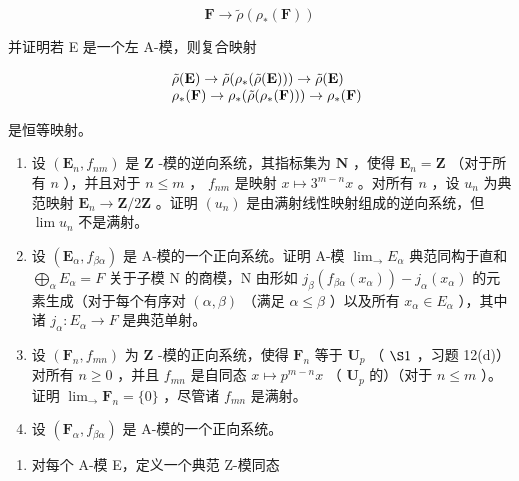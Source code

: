 \[
\mathbf {F} \rightarrow \tilde {\rho} (\rho_ {*} (\mathbf {F}))
\]

并证明若 E 是一个左 A-模，则复合映射

\[
\begin{array}{r l} & {\tilde {\rho} (\mathbf {E}) \to \tilde {\rho} (\rho_ {*} (\tilde {\rho} (\mathbf {E}))) \to \tilde {\rho} (\mathbf {E})} \\ & {\rho_ {*} (\mathbf {F}) \to \rho_ {*} (\tilde {\rho} (\rho_ {*} (\mathbf {F}))) \to \rho_ {*} (\mathbf {F})} \end{array}
\]

是恒等映射。

\BourbakiExercisesSection

\begin{enumerate}
\def\labelenumi{\arabic{enumi}.}
\item
  设 \((\mathbf{E}_n, f_{nm})\) 是 \(\mathbf{Z}\) -模的逆向系统，其指标集为 \(\mathbf{N}\) ，使得 \(\mathbf{E}_n = \mathbf{Z}\) （对于所有 \(n\) ），并且对于 \(n \leqslant m\) ， \(f_{nm}\) 是映射 \(x \mapsto 3^{m - n}x\) 。对所有 \(n\) ，设 \(u_n\) 为典范映射 \(\mathbf{E}_n \to \mathbf{Z}/2\mathbf{Z}\) 。证明 \((u_n)\) 是由满射线性映射组成的逆向系统，但 \(\lim u_n\) 不是满射。
\item
  设 \((\mathbf{E}_{\alpha}, f_{\beta\alpha})\) 是 A-模的一个正向系统。证明 A-模 \(\lim_{\rightarrow} E_{\alpha}\) 典范同构于直和 \(\bigoplus_{\alpha} E_{\alpha} = F\) 关于子模 N 的商模，N 由形如 \(j_{\beta}(f_{\beta\alpha}(x_{\alpha})) - j_{\alpha}(x_{\alpha})\) 的元素生成（对于每个有序对 \((\alpha, \beta)\) （满足 \(\alpha \leqslant \beta\) ）以及所有 \(x_{\alpha} \in E_{\alpha}\) ），其中诸 \(j_{\alpha}: E_{\alpha} \to F\) 是典范单射。
\item
  设 \((\mathbf{F}_n, f_{mn})\) 为 \(\mathbf{Z}\) -模的正向系统，使得 \(\mathbf{F}_n\) 等于 \(\mathbf{U}_p\) （ \(\S 1\) ，习题 12(d)）对所有 \(n \geqslant 0\) ，并且 \(f_{mn}\) 是自同态 \(x \mapsto p^{m-n}x\) （ \(\mathbf{U}_p\) 的）（对于 \(n \leqslant m\) ）。证明 \(\lim_{\longrightarrow} \mathbf{F}_n = \{0\}\) ，尽管诸 \(f_{mn}\) 是满射。
\item
  设 \((\mathbf{F}_{\alpha}, f_{\beta \alpha})\) 是 A-模的一个正向系统。
\end{enumerate}

\begin{enumerate}
\def\labelenumi{(\alph{enumi})}
\tightlist
\item
  对每个 A-模 E，定义一个典范 Z-模同态
\end{enumerate}

